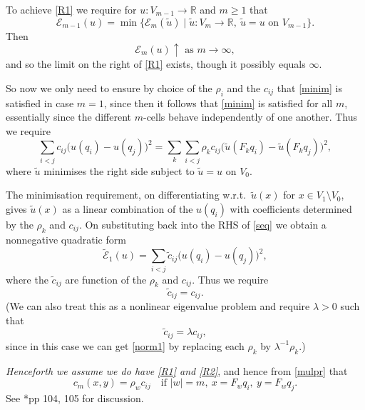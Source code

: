 \documentclass[a4paper]{amsart}
\theoremstyle{plain}
\theoremstyle{definition}
\theoremstyle{remark}
\begin{document}
\bigskip
To achieve \eqref{R1} we require for $ u : V_{m-1} \to \mathbb{R} $ and $ m \geq 1 $ that 
\begin{equation} \label{minim} 
\mathcal{E}_{m-1} (u) = \min \big\{ \mathcal{E} _m (\widetilde{u}) \mid \widetilde{u} : V_m \to \mathbb{R}, \ \widetilde{u} = u \text{ on } V_{m-1}  \big\}.
\end{equation} 
Then 
\[
\mathcal{E}  _m(u)\uparrow \text{ as } m \to \infty ,
\]
and so the limit on the right of \eqref{R1} exists, though it possibly equals $ \infty $.



So now we only need to ensure by choice of the $ \rho_i $ and the $ c_{ij} $  that \eqref{minim} is satisfied in case $ m=1 $, since then it follows that \eqref{minim} is satisfied for all $ m $, essentially since the different $ m $-cells behave independently of one another.  Thus we require
\begin{equation} \label{seq} 
  \sum_{i< j} c_{ij} \big( u(q_i) - u(q_j) \big) ^2  
  =
  \sum_{k }  \sum_{i< j}  \rho_k c_{ij}  \big( \widetilde{u}(F_k q_i) -  \widetilde{u}(F_k q_j) \big) ^2,
\end{equation} 
where $ \widetilde{u} $ minimises the right side subject to $ \widetilde{u} = u $ on $ V_0 $.

The minimisation requirement, on differentiating w.r.t.\  $ \widetilde{u}(x) $ for $ x \in V_1\setminus V_0 $, gives $ \widetilde{u}(x) $ as a linear combination of the $ u(q_i) $ with coefficients determined by the $ \rho_k $ and $ c_{ij} $.  On substituting back into the RHS of \eqref{seq} we obtain a nonnegative quadratic form 
\begin{equation} \label{etil} 
\widetilde{\mathcal{E}} _1 (u) = \sum_{i< j} \widetilde{c}_{ij} \big( u(q_i) - u(q_j) \big) ^2 ,
\end{equation} 
where the $ \widetilde{c}_{ij} $ are function of the $ \rho_k $ and $ c_{ij} $.  
Thus we require
\begin{equation} \label{norm1} 
\widetilde{c}_{ij} = c_{ij} .
\end{equation} 
(We can also treat this as a nonlinear eigenvalue problem and require $ \lambda >0 $ such that 
\begin{equation} \label{ctc} 
\widetilde{c}_{ij} = \lambda c_{ij} ,
\end{equation} 
since in this case we can get \eqref{norm1} by replacing each $ \rho_k $ by $ \lambda  ^{-1} \rho_k $.)

\bigskip
\noindent \emph{Henceforth we assume   we do have \eqref{R1} and \eqref{R2}},  and hence from 
\eqref{mulpr} that 
\begin{equation} \label{coefff}
c_m(x,y) = \rho_w c_{ij}\quad  \text{if } |w|=m, \ x = F_w q_i, \ y = F_w q_j .
\end{equation}
See \cite{Str}*{pp 104, 105} for discussion.
\end{document}
